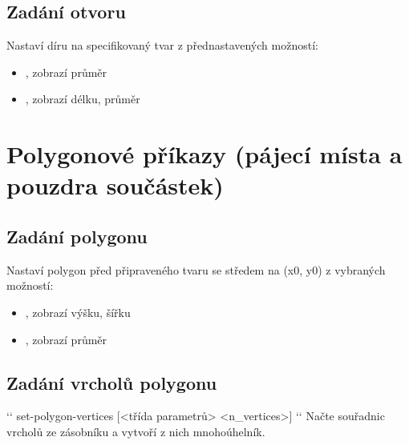 \documentclass[letterpaper,10pt,czech]{sphinxmanual}
\begin{document}
\subsection{Zadání otvoru}
\label{\detokenize{parameter-programs_cz:zadani-otvoru}}
 Nastaví díru na specifikovaný tvar z přednastavených možností:
\begin{itemize}
\item {} 
, zobrazí průměr

\item {} 
, zobrazí délku, průměr

\end{itemize}


\section{Polygonové příkazy (pájecí místa a pouzdra součástek)}
\label{\detokenize{parameter-programs_cz:polygonove-prikazy-pajeci-mista-a-pouzdra-soucastek}}

\subsection{Zadání polygonu}
\label{\detokenize{parameter-programs_cz:zadani-polygonu}}
 Nastaví polygon
před připraveného tvaru se středem na (x0, y0) z vybraných možností:
\begin{itemize}
\item {} 
, zobrazí výšku, šířku

\item {} 
, zobrazí průměr

\end{itemize}


\subsection{Zadání vrcholů polygonu}
\label{\detokenize{parameter-programs_cz:zadani-vrcholu-polygonu}}
{}`{}` set-polygon-vertices {[}\textless{}třída parametrů\textgreater{} \textless{}n\_vertices\textgreater{}{]} {}`{}` Načte  souřadnic vrcholů ze zásobníku a vytvoří z nich mnohoúhelník.
\end{document}
